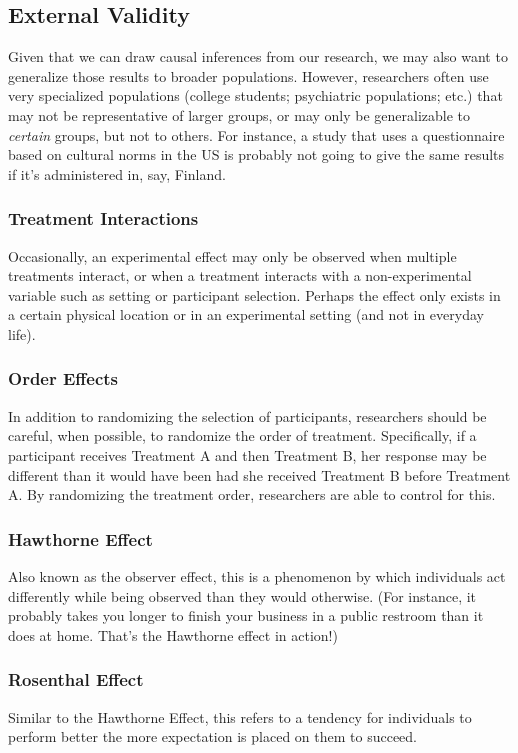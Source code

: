 \subsection{External Validity}

Given that we can draw causal inferences from our research, we may also want to generalize those results to broader populations. However, researchers often use very specialized populations (college students; psychiatric populations; etc.) that may not be representative of larger groups, or may only be generalizable to \textit{certain} groups, but not to others. For instance, a study that uses a questionnaire based on cultural norms in the US is probably not going to give the same results if it's administered in, say, Finland.

\subsubsection{Treatment Interactions}
Occasionally, an experimental effect may only be observed when multiple treatments interact, or when a treatment interacts with a non-experimental variable such as setting or participant selection. Perhaps the effect only exists in a certain physical location or in an experimental setting (and not in everyday life).

\subsubsection{Order Effects}
In addition to randomizing the selection of participants, researchers should be careful, when possible, to randomize the order of treatment. Specifically, if a participant receives Treatment A and then Treatment B, her response may be different than it would have been had she received Treatment B before Treatment A. By randomizing the treatment order, researchers are able to control for this.

\subsubsection{Hawthorne Effect}
Also known as the observer effect, this is a phenomenon by which individuals act differently while being observed than they would otherwise. (For instance, it probably takes you longer to finish your business in a public restroom than it does at home. That's the Hawthorne effect in action!)

\subsubsection{Rosenthal Effect}
Similar to the Hawthorne Effect, this refers to a tendency for individuals to perform better the more expectation is placed on them to succeed.

